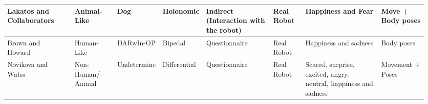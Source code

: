 \begin{table}[h]
\begin{center}
\begin{tabular}{|p{2.3 cm}|p{1.5 cm}|p{1.3 cm}|p{1.4 cm}|p{1.4 cm}|p{1.0 cm}|p{2.2 cm}|p{1.4 cm}|}
\hline
Lakatos and Collaborators~\cite{Lakatos2014}& Animal-Like & Dog & Holonomic & Indirect (Interaction with the robot) & Real Robot & Happiness and Fear &  Move + Body poses \\
\hline
Brown and Howard~\cite{Brown2014}& Human-Like & DARwIn-OP & Bipedal & Questionnaire & Real Robot & Happiness and sadness & Body poses\\
\hline
Novikova and Watss~\cite{Novika2015}&Non-Human/ Animal & Undetermine & Differential& Questionnaire& Real Robot & Scared, surprise, excited, angry, neutral, happiness and sadness &  Movement + Poses\\
\hline 
\end{tabular} 
\end{center}
\end{table}